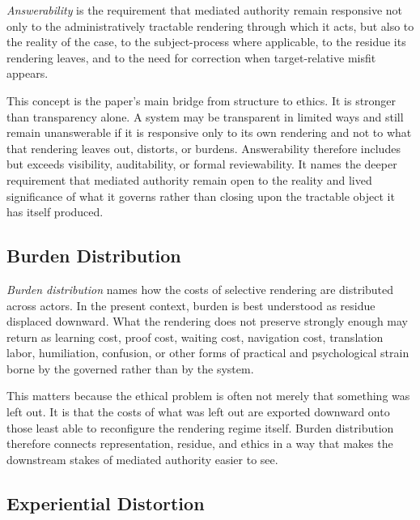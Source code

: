\documentclass[11pt]{article}
\renewcommand{\emph}[1]{\textit{#1}}
\begin{document}
\emph{Answerability} is the requirement that mediated authority remain responsive not only to the administratively tractable rendering through which it acts, but also to the reality of the case, to the subject-process where applicable, to the residue its rendering leaves, and to the need for correction when target-relative misfit appears. \cite{Swanson2026SharedRealityConditionDisclosure,Swanson2026MediatedJudgmentConstraint,Swanson2026ConstraintConditionDisclosure,Swanson2026EmbeddedProcess}

This concept is the paper's main bridge from structure to ethics. It is stronger than transparency alone. A system may be transparent in limited ways and still remain unanswerable if it is responsive only to its own rendering and not to what that rendering leaves out, distorts, or burdens. Answerability therefore includes but exceeds visibility, auditability, or formal reviewability. It names the deeper requirement that mediated authority remain open to the reality and lived significance of what it governs rather than closing upon the tractable object it has itself produced.

\subsection{Burden Distribution}

\emph{Burden distribution} names how the costs of selective rendering are distributed across actors. In the present context, burden is best understood as residue displaced downward. What the rendering does not preserve strongly enough may return as learning cost, proof cost, waiting cost, navigation cost, translation labor, humiliation, confusion, or other forms of practical and psychological strain borne by the governed rather than by the system. \cite{MoynihanHerdHarvey2015AdministrativeBurden,Eubanks2018AutomatingInequality}

This matters because the ethical problem is often not merely that something was left out. It is that the costs of what was left out are exported downward onto those least able to reconfigure the rendering regime itself. Burden distribution therefore connects representation, residue, and ethics in a way that makes the downstream stakes of mediated authority easier to see.

\subsection{Experiential Distortion}
\end{document}
